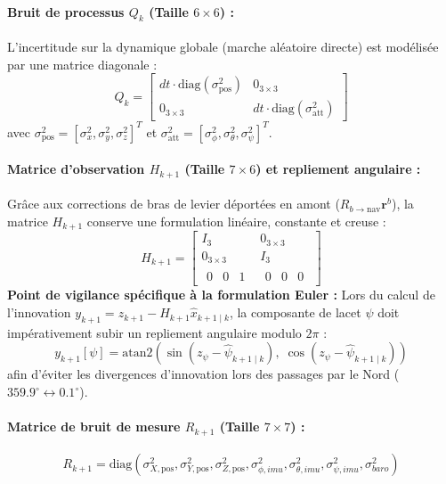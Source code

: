 \documentclass[../Formulations_Kalman.tex]{subfiles}
\begin{document}
\paragraph{Bruit de processus $Q_k$ (Taille $6 \times 6$) :}
L'incertitude sur la dynamique globale (marche aléatoire directe) est modélisée par une matrice diagonale :
\begin{equation}
Q_k = \begin{bmatrix}
dt \cdot \text{diag}(\sigma_{\text{pos}}^2) & 0_{3\times3} \\
0_{3\times3} & dt \cdot \text{diag}(\sigma_{\text{att}}^2)
\end{bmatrix}
\end{equation}
avec $\sigma_{\text{pos}}^2 = [\sigma_{x}^2, \sigma_{y}^2, \sigma_{z}^2]^T$ et $\sigma_{\text{att}}^2 = [\sigma_{\phi}^2, \sigma_{\theta}^2, \sigma_{\psi}^2]^T$.

\paragraph{Matrice d'observation $H_{k+1}$ (Taille $7 \times 6$) et repliement angulaire :}
Grâce aux corrections de bras de levier déportées en amont ($R_{b \to \text{nav}} \mathbf{r}^b$), la matrice $H_{k+1}$ conserve une formulation linéaire, constante et creuse :
\begin{equation}
H_{k+1} = \begin{bmatrix}
I_3 & 0_{3\times3} \\
0_{3\times3} & I_3 \\
\begin{matrix} 0 & 0 & 1 \end{matrix} & \begin{matrix} 0 & 0 & 0 \end{matrix}
\end{bmatrix}
\end{equation}
\textbf{Point de vigilance spécifique à la formulation Euler :} Lors du calcul de l'innovation $y_{k+1} = z_{k+1} - H_{k+1}\hat{x}_{k+1\mid k}$, la composante de lacet $\psi$ doit impérativement subir un repliement angulaire modulo $2\pi$ :
\begin{equation}
y_{k+1}[\psi] = \text{atan2}\left(\sin(z_{\psi} - \hat{\psi}_{k+1\mid k}), \; \cos(z_{\psi} - \hat{\psi}_{k+1\mid k})\right)
\end{equation}
afin d'éviter les divergences d'innovation lors des passages par le Nord ($359.9^\circ \leftrightarrow 0.1^\circ$).

\paragraph{Matrice de bruit de mesure $R_{k+1}$ (Taille $7 \times 7$) :}
\begin{equation}
R_{k+1} = \text{diag}(\sigma_{X,\text{pos}}^2, \sigma_{Y,\text{pos}}^2, \sigma_{Z,\text{pos}}^2, \sigma_{\phi,imu}^2, \sigma_{\theta,imu}^2, \sigma_{\psi,imu}^2, \sigma_{baro}^2)
\end{equation}
\end{document}
